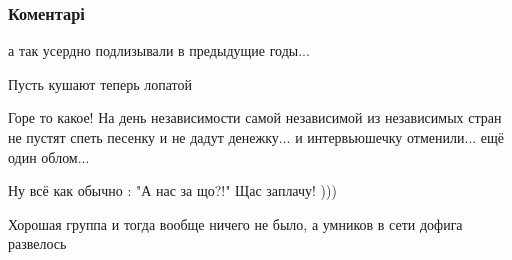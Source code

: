  
 
 
 
 
\subsubsection{Коментарі}

\begin{itemize}
 
а так усердно подлизывали в предыдущие годы...

\begin{itemize}
 
Пусть кушают теперь лопатой
\end{itemize}

 

Горе то какое! На день независимости самой независимой из независимых стран не
пустят спеть песенку и не дадут денежку... и интервьюшечку отменили... ещё один
облом...

Ну всё как обычно : "А нас за що?!" Щас заплачу! )))


 
Хорошая группа и тогда вообще ничего не было, а умников в сети дофига развелось


\end{itemize}
